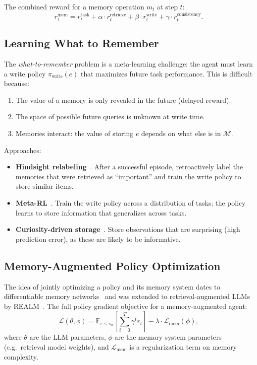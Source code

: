 The combined reward for a memory operation $m_t$ at step $t$: 
\[
r_t^{\text{mem}} = r_t^{\text{task}} + \alpha \cdot r_t^{\text{retrieve}} + \beta \cdot r_t^{\text{write}} + \gamma \cdot r_t^{\text{consistency}}.
\]

\subsection{Learning What to Remember}
\label{learning-what-to-remember}

The \emph{what-to-remember} problem is a meta-learning challenge: the agent must learn a write policy $\pi_\text{write}(e)$ that maximizes future task performance. This is difficult because:

\begin{enumerate}
  \item The value of a memory is only revealed in the future (delayed reward).
  \item The space of possible future queries is unknown at write time.
  \item Memories interact: the value of storing $e$ depends on what else is in $\mathcal{M}$.
\end{enumerate}

Approaches:

\begin{itemize}
  \item \textbf{Hindsight relabeling}~\cite{andrychowicz2017hindsight}. After a successful episode, retroactively label the memories that were retrieved as ``important'' and train the write policy to store similar items.
  \item \textbf{Meta-RL}~\cite{duan2016rl2}. Train the write policy across a distribution of tasks; the policy learns to store information that generalizes across tasks.
  \item \textbf{Curiosity-driven storage}~\cite{pathak2017curiosity}. Store observations that are surprising (high prediction error), as these are likely to be informative.
\end{itemize}

\subsection{Memory-Augmented Policy Optimization}
\label{memory-augmented-policy-optimization}

The idea of jointly optimizing a policy and its memory system dates to differentiable memory networks~\cite{graves2016hybrid} and was extended to retrieval-augmented LLMs by REALM~\cite{guu2020realm}. The full policy gradient objective for a memory-augmented agent: 
\[
\mathcal{L}(\theta, \phi) = \mathbb{E}_{\tau \sim \pi_\theta}\!\left[\sum_{t=0}^T \gamma^t r_t\right] - \lambda \cdot \mathcal{L}_\text{mem}(\phi),
\]
 where $\theta$ are the LLM parameters, $\phi$ are the memory system parameters (e.g.~retrieval model weights), and $\mathcal{L}_\text{mem}$ is a regularization term on memory complexity.

